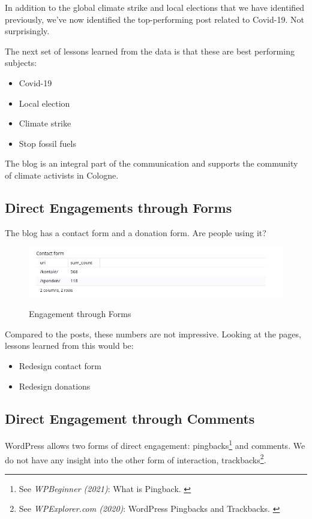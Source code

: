 In addition to the global climate strike and local elections that we have identified previously, we've now identified the top-performing post related to Covid-19. Not surprisingly.

The next set of lessons learned from the data is that these are best performing subjects:

\begin{itemize}
 \item Covid-19
 \item Local election
 \item Climate strike
 \item Stop fossil fuels
\end{itemize}

The blog is an integral part of the communication and supports the community of climate activists in Cologne.

\subsection{Direct Engagements through Forms}

The blog has a contact form and a donation form. Are people using it?

\begin{figure}[H]
\centering
\caption {Engagement through Forms}
\includegraphics[width=\linewidth]{images/figure14.png}
\label{fig:engagementForms}
\end{figure}

Compared to the posts, these numbers are not impressive. Looking at the pages, lessons learned from this would be:

\begin{itemize}
 \item Redesign contact form
 \item Redesign donations
\end{itemize}

\subsection{Direct Engagement through Comments}

WordPress allows two forms of direct engagement: pingbacks\footnote{See \textit{WPBeginner (2021)}: What is Pingback. \cite{pingBack}} and comments. We do not have any insight into the other form of interaction, trackbacks\footnote{See \textit{WPExplorer.com (2020)}: WordPress Pingbacks and Trackbacks. \cite{trackBack}}.


